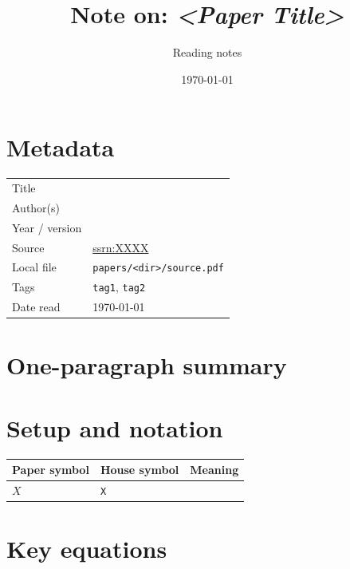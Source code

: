 \documentclass[11pt,a4paper]{article}
\title{Note on: \emph{<Paper Title>}}
\author{Reading notes}
\date{\today}
\begin{document}
\maketitle

\section*{Metadata}
\begin{tabular}{@{}p{3.5cm}p{11cm}@{}}
\toprule
Title           & \\
Author(s)       & \\
Year / version  & \\
Source          & \href{https://ssrn.com/abstract=XXXX}{ssrn:XXXX} \\
Local file      & \texttt{papers/<dir>/source.pdf} \\
Tags            & \texttt{tag1}, \texttt{tag2} \\
Date read       & \today \\
\bottomrule
\end{tabular}

\section*{One-paragraph summary}

\section{Setup and notation}

\begin{tabular}{@{}p{3cm}p{4cm}p{8cm}@{}}
\toprule
Paper symbol & House symbol & Meaning \\
\midrule
$X$ & \texttt{X} & \\
\bottomrule
\end{tabular}

\section{Key equations}
\end{document}
